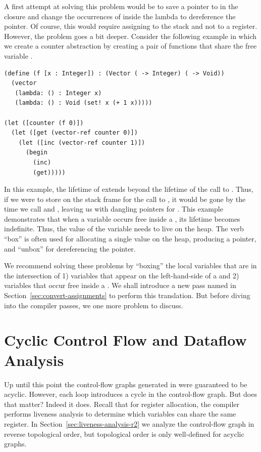 \documentclass[11pt]{book}
\begin{document}
A first attempt at solving this problem would be to save a pointer to
 in the closure and change the occurrences of  inside
the lambda to dereference the pointer. Of course, this would require
assigning  to the stack and not to a register. However, the
problem goes a bit deeper. Consider the following example in which we
create a counter abstraction by creating a pair of functions that
share the free variable .
\begin{lstlisting}
(define (f [x : Integer]) : (Vector ( -> Integer) ( -> Void))
  (vector
   (lambda: () : Integer x)
   (lambda: () : Void (set! x (+ 1 x)))))

(let ([counter (f 0)])
  (let ([get (vector-ref counter 0)])
    (let ([inc (vector-ref counter 1)])
      (begin
        (inc)
        (get)))))
\end{lstlisting}
In this example, the lifetime of  extends beyond the lifetime
of the call to . Thus, if we were to store  on the
stack frame for the call to , it would be gone by the time we
call  and , leaving us with dangling pointers for
. This example demonstrates that when a variable occurs free
inside a , its lifetime becomes indefinite. Thus, the
value of the variable needs to live on the heap.  The verb ``box'' is
often used for allocating a single value on the heap, producing a
pointer, and ``unbox'' for dereferencing the pointer.

We recommend solving these problems by ``boxing'' the local variables
that are in the intersection of 1) variables that appear on the
left-hand-side of a  and 2) variables that occur free
inside a . We shall introduce a new pass named
 in Section~\ref{sec:convert-assignments} to
perform this translation. But before diving into the compiler passes,
we one more problem to discuss.

\section{Cyclic Control Flow and Dataflow Analysis}
\label{sec:dataflow-analysis}

Up until this point the control-flow graphs generated in
 were guaranteed to be acyclic. However, each
 loop introduces a cycle in the control-flow graph.
But does that matter?
%
Indeed it does.  Recall that for register allocation, the compiler
performs liveness analysis to determine which variables can share the
same register.  In Section~\ref{sec:liveness-analysis-r2} we analyze
the control-flow graph in reverse topological order, but topological
order is only well-defined for acyclic graphs.
\end{document}

